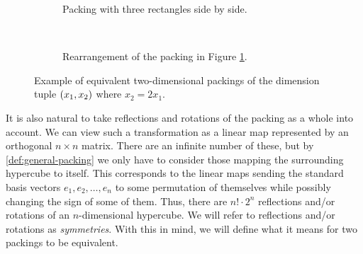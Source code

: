 \begin{figure}[h]
    \centering
    \begin{subfigure}[b]{0.37\textwidth}
        \centering
        \caption{Packing with three rectangles side by side.}
        \label{fig:extreme-packing-2d}
    \end{subfigure}
    ~
    \begin{subfigure}[b]{0.37\textwidth}
        \centering
        \caption{Rearrangement of the packing in Figure \ref{fig:extreme-packing-2d}.}
        \label{fig:rearrangement-packing-2d}
    \end{subfigure}
    \caption{Example of equivalent two-dimensional packings of the dimension tuple $\left( x_1, x_2 \right)$ where $x_2 = 2 x_1$.}
\end{figure}

\noindent It is also natural to take reflections and rotations of the packing as a whole into account. We can view such a transformation as a linear map represented by an orthogonal $n \times n$ matrix. There are an infinite number of these, but by \cref{def:general-packing} we only have to consider those mapping the surrounding hypercube to itself. This corresponds to the linear maps sending the standard basis vectors $e_1, e_2, \dotsc, e_n$ to some permutation of themselves while possibly changing the sign of some of them. Thus, there are $n! \cdot 2^n$ reflections and/or rotations of an $n$-dimensional hypercube. We will refer to reflections and/or rotations as \textit{symmetries}. With this in mind, we will define what it means for two packings to be equivalent.

